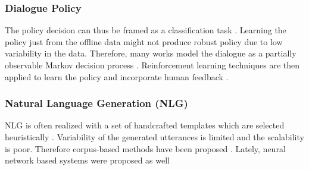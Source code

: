 \subsubsection{Dialogue Policy}
The policy decision can thus be framed as a classification task \cite{gavsic2013gaussian}.
Learning the policy just from the offline data might not produce robust policy due to low variability in the data.
Therefore, many works model the dialogue as a partially observable Markov decision process \cite{gavsic2010gaussian, thomson2010bayesian}.
Reinforcement learning techniques are then applied to learn the policy and incorporate human feedback \cite{peng2017composite, su2016line}.

\subsubsection{Natural Language Generation (NLG)}
NLG is often realized with a set of handcrafted templates which are selected heuristically \cite{rudnicky_creating_1999}.
Variability of the generated utterances is limited and the scalability is poor.
Therefore corpus-based methods have been proposed \cite{oh2000stochastic, mairesse-young-2014-stochastic}.
Lately, neural network based systems were proposed as well \cite{wen-etal-2015-semantically, wen-etal-2016-multi}


